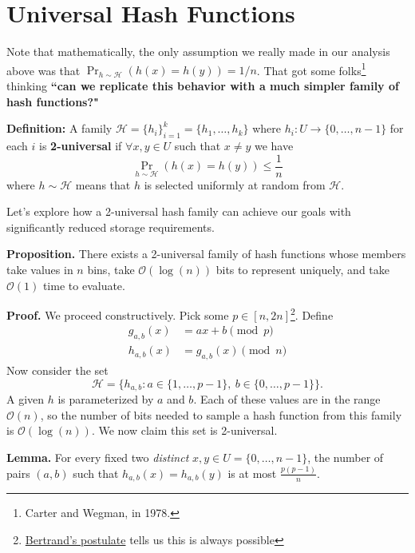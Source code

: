 \documentclass[14pt]{extreport}
\begin{document}
\section*{Universal Hash Functions}
    Note that mathematically, the only assumption we really made in our analysis above was that $\Pr_{h \sim \mathcal{H}} (h(x) = h(y)) = 1/n$. That got some folks\footnote{Carter and Wegman, in 1978.} thinking \textbf{``can we replicate this behavior with a much simpler family of hash functions?"}
    \begin{tcolorbox}[colframe=gray!50, sharp corners]
        \textbf{Definition:} A family $\mathcal{H} = \{h_{i}\}^{k}_{i = 1} = \{h_{1}, \dots, h_{k}\}$ where $h_{i} \colon U \rightarrow \{0, \dots, n - 1\}$ for each $i$ is \textbf{2-universal} if $\forall x, y \in U$ such that $ x \ne y$ we have $$\Pr_{h \sim \mathcal{H}} (h(x) = h(y)) \le \frac{1}{n}$$ where $h \sim \mathcal{H}$ means that $h$  is selected uniformly at random from $\mathcal{H}$.
    \end{tcolorbox}
    Let's explore how a 2-universal hash family can achieve our goals with significantly reduced storage requirements.

    \vspace{5mm}
    \textbf{Proposition.} There exists a 2-universal family of hash functions  whose members take values in $n$ bins, take $\mathcal{O}(\log(n))$ bits to represent uniquely, and take $\mathcal{O}(1)$ time to evaluate.

    \vspace{5mm}
    \textbf{Proof.} We proceed constructively. Pick some $p \in [n, 2n]$\footnote{\href{https://en.wikipedia.org/wiki/Bertrand}{Bertrand's postulate} tells us this is always possible}. Define 
    \begin{align*}
        g_{a, b}(x) &= ax + b \pmod{p} \\
        h_{a, b}(x) &= g_{a, b}(x) \pmod{n}
    \end{align*}
    Now consider the set $$\mathcal{H} = \{h_{a,b} : a \in \{1,\dots,p-1\},\ b \in \{0,\dots,p-1\}\}.$$ A given $h$ is parameterized by $a$ and $b$. Each of these values are in the range $\mathcal{O}(n)$, so the number of bits needed to sample a hash function from this family is $\mathcal{O}(\log(n))$. We now claim this set is 2-universal.

    \vspace{5mm}
    \textbf{Lemma.} For every fixed two \textit{distinct} $x, y \in U = \{0, \dots, n - 1\}$, the number of pairs $(a, b)$ such that $h_{a, b}(x) = h_{a, b}(y)$ is at most $\frac{p(p - 1)}{n}$.
\end{document}
